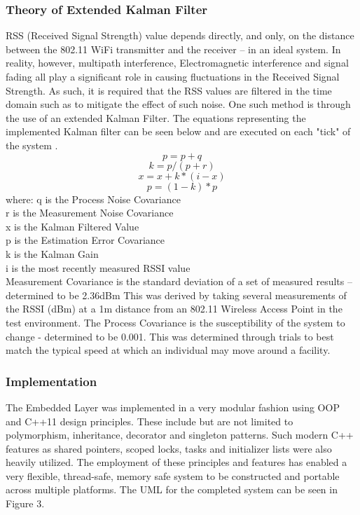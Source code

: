 \documentclass[conference]{IEEEtran}
\begin{document}
\subsubsection{Theory of Extended Kalman Filter}
RSS (Received Signal Strength) value depends directly, and only, on the distance between the 802.11 WiFi transmitter and the receiver – in an ideal system. In reality, however, multipath interference, Electromagnetic interference and signal fading all play a significant role in causing fluctuations in the Received Signal Strength. As such, it is required that the RSS values are filtered in the time domain such as to mitigate the effect of such noise. One such method is through the use of an extended Kalman Filter. The equations representing the implemented Kalman filter can be seen below and are executed on each "tick" of the system \cite{KalmanFilter}.
\begin{equation}
p = p + q
\end{equation}
\begin{equation}
k = p / (p + r)
\end{equation}
\begin{equation}
x = x + k * (i - x)
\end{equation}
\begin{equation}
p = (1 - k) * p
\end{equation}
where:
\newline
q is the Process Noise Covariance \\
r  is the Measurement Noise Covariance \\
x is the Kalman Filtered Value \\
p is the Estimation Error Covariance \\
k is the Kalman Gain \\
i is the most recently measured RSSI value\\

\noindent Measurement Covariance is the standard deviation of a set of measured results – determined to be 2.36dBm This was derived by taking several measurements of the RSSI (dBm) at a 1m distance from an 802.11 Wireless Access Point in the test environment. The Process Covariance is the susceptibility of the system to change - determined to be 0.001. This was determined through trials to best match the typical speed at which an individual may move around a facility.
\newline
\subsubsection{Implementation}
The Embedded Layer was implemented in a very modular fashion using OOP and C++11 design principles. These include but are not limited to polymorphism, inheritance, decorator and singleton patterns. Such modern C++ features as shared pointers, scoped locks, tasks and initializer lists were also heavily utilized.
The employment of these principles and features has enabled a very flexible, thread-safe, memory safe system to be constructed and portable across multiple platforms. The UML for the completed system can be seen in Figure 3.
\end{document}

